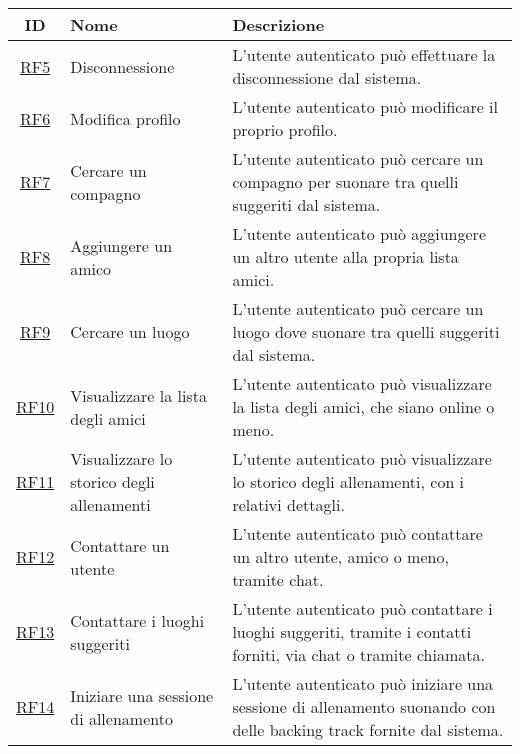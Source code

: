 \documentclass[12pt, a4paper]{article}
\begin{document}
\begin{longtable}{|c|p{5cm}|p{7cm}|}
    \hline \textbf{ID}            & \textbf{Nome}                               & \textbf{Descrizione}                                                                                                \\  \hline
    \hline \hyperlink{RF5}{RF5}   & Disconnessione                              & L'utente autenticato può effettuare la disconnessione dal sistema.                                                  \\ \hline
    \hline\hyperlink{RF6}{RF6}    & Modifica profilo                            & L'utente autenticato può modificare il proprio profilo.                                                             \\ \hline
    \hline \hyperlink{RF7}{RF7}   & Cercare un compagno                         & L'utente autenticato può cercare un compagno per suonare tra quelli suggeriti dal sistema.                          \\ \hline
    \hline \hyperlink{RF8}{RF8}   & Aggiungere un amico                         & L'utente autenticato può aggiungere un altro utente alla propria lista amici.                                       \\ \hline
    \hline \hyperlink{RF9}{RF9}   & Cercare un luogo                            & L'utente autenticato può cercare un luogo dove suonare tra quelli suggeriti dal sistema.                            \\ \hline
    \hline \hyperlink{RF10}{RF10} & Visualizzare la lista degli amici           & L'utente autenticato può visualizzare la lista degli amici, che siano online o meno.                                \\ \hline
    \hline \hyperlink{RF11}{RF11} & Visualizzare lo storico degli allenamenti   & L'utente autenticato può visualizzare lo storico degli allenamenti, con i relativi dettagli.                        \\ \hline
    \hline \hyperlink{RF12}{RF12} & Contattare un utente                        & L'utente autenticato può contattare un altro utente, amico o meno, tramite chat.                                    \\ \hline
    \hline \hyperlink{RF13}{RF13} & Contattare i luoghi suggeriti               & L'utente autenticato può contattare i luoghi suggeriti, tramite i contatti forniti, via chat o tramite chiamata.    \\ \hline
    \hline \hyperlink{RF14}{RF14} & Iniziare una sessione di allenamento        & L'utente autenticato può iniziare una sessione di allenamento suonando con delle backing track fornite dal sistema. \\ \hline

\end{longtable}
\end{document}
